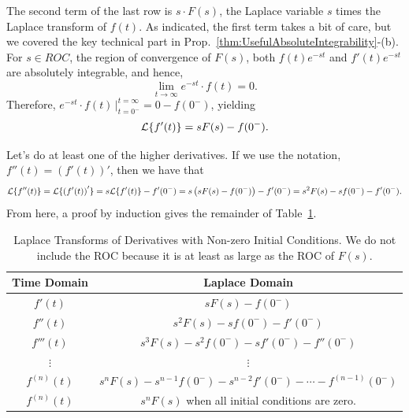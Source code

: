 The second term of the last row is $s \cdot F(s)$, the Laplace variable $s$ times the Laplace transform of $f(t)$. As indicated, the first term takes a bit of care, but we covered the key technical part in Prop.~\ref{thm:UsefulAbsoluteIntegrability}-(b). For $s \in ROC$, the region of convergence of $F(s)$, both $f(t) e^{-st} $ and $f'(t) e^{-st} $ are absolutely integrable, and hence, 
$$ \lim_{t\to \infty} e^{-st} \cdot f(t) = 0.$$ 
Therefore, $e^{-st} \cdot f(t) \, \bigg|_{t={0^-}}^{t=\infty} = 0 - f(0^-)$, yielding
$${\cal L}\{f'(t) \} = s F(s) - f(0^-). $$

Let's do at least one of the higher derivatives. If we use the notation, $f''(t) = \left(f'(t) \right)'$, then we have that 
$$ {\cal L}\{ f''(t) \} = {\cal L}\{ \left(f'(t) \right)' \} = s  {\cal L}\{f'(t) \} - f'(0^-) = s \left( sF(s) - f(0^-) \right) - f'(0^-) = s^2 F(s) - s f(0^-) - f'(0^-).$$
From here, a proof by induction gives the remainder of Table~\ref{tab:laplace_derivatives}.

\Qed

\vspace*{.2cm} 
\begin{table}[hbtp]
\centering
\renewcommand{\arraystretch}{1.8} %
\caption{Laplace Transforms of Derivatives with Non-zero Initial Conditions. We do not include the ROC because it is at least as large as the ROC of $F(s)$. }
\begin{tabular}{|c|c|}
\hline
\textbf{Time Domain} & \textbf{Laplace Domain} \\
\hline
$f'(t)$ & $sF(s) - f(0^-)$ \\
\hline
$f''(t)$ & $s^2F(s) - sf(0^-) - f'(0^-)$ \\
\hline
$f'''(t)$ & $s^3F(s) - s^2f(0^-) - sf'(0^-) - f''(0^-)$ \\
\hline
$\vdots$ & $\vdots$ \\
\hline
$f^{(n)}(t)$ & $s^nF(s) - s^{n-1}f(0^-) - s^{n-2}f'(0^-) - \cdots - f^{(n-1)}(0^-)$ \\
\hline
$f^{(n)}(t)$ & $s^nF(s)$ when all initial conditions are zero.\\
\hline
\end{tabular}
\label{tab:laplace_derivatives}
\end{table}

\vspace*{.2cm}


